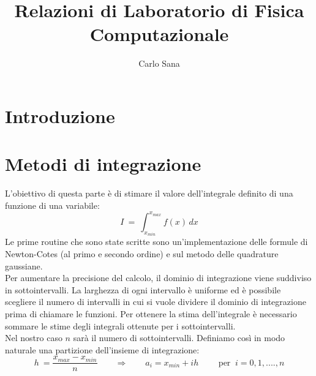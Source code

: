 
\usepackage{minted}
\usepackage{enumerate}
\usepackage{booktabs}
\title{Relazioni di Laboratorio di Fisica Computazionale}
\author{Carlo Sana}

\maketitle
\section{Introduzione}


\section{Metodi di integrazione}
L'obiettivo di questa parte è di stimare il valore dell'integrale definito di una funzione di una variabile:
$$
 	I \ = \ \int_{x_{min}}^{x_{max}} f(x) \, dx
$$
Le prime routine che sono state scritte sono un'implementazione delle formule di Newton-Cotes (al primo e secondo ordine)
e sul metodo delle quadrature gaussiane.\\
Per aumentare la precisione del calcolo, il dominio di integrazione viene suddiviso in sottointervalli.
La larghezza di ogni intervallo è uniforme ed è possibile scegliere il numero di intervalli in cui
si vuole dividere il dominio di integrazione prima di chiamare le funzioni.
Per ottenere la stima dell'integrale è necessario sommare le stime degli integrali ottenute per i sottointervalli.\\
Nel nostro caso $n$ sarà il numero di sottointervalli. Definiamo così in modo naturale una partizione dell'insieme di integrazione:
$$
	h \ = \frac{x_{max} - x_{min}}{ n} \qquad \Longrightarrow \qquad a_i = x_{min} + i h  \qquad
	\mbox{ per } \ i = 0,1,....,n 
$$

